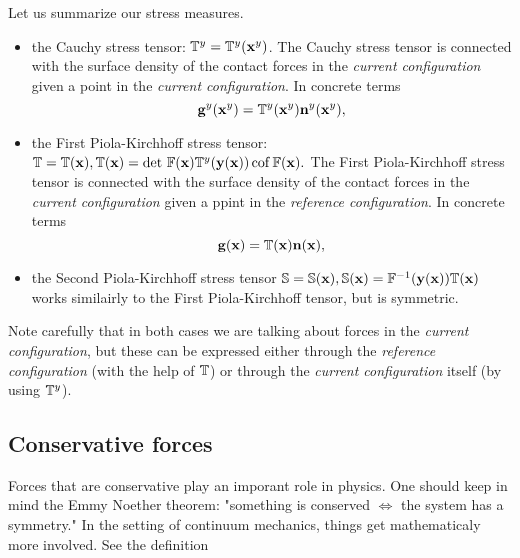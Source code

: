 \documentclass[11pt]{scrartcl} %
\begin{document}
\begin{remark}
    Let us summarize our stress measures.
    \begin{itemize}
	    \item the Cauchy stress tensor: $\mathbb{T}^y = \mathbb{T}^y\qty(\vb{x}^{y})$. The Cauchy stress tensor is connected with the surface density of the contact forces in the \textit{current configuration} given a point in the \textit{current configuration}. In concrete terms
		    \[
			    \vb{g}^{y}\qty(\vb{x}^{y}) = \mathbb{T}^y\qty(\vb{x}^{y})\vb{n}^{y}\qty(\vb{x}^{y}),
		    \]
	    \item the First Piola-Kirchhoff stress tensor: $\mathbb{T} = \mathbb{T}(\vb{x}), \mathbb{T}\qty(\vb{x}) = \det\, \mathbb{F} \qty(\vb{x}) \mathbb{T}^y\qty(\vb{y}\qty(\vb{x})) \operatorname{cof} \mathbb{F} \qty(\vb{x}).$ The First Piola-Kirchhoff stress tensor is connected with the surface density of the contact forces in the \textit{current configuration} given a ppint in the \textit{reference configuration}. In concrete terms
		    \[
			    \vb{g}\qty(\vb{x}) = \mathbb{T}\qty(\vb{x}) \vb{n}\qty(\vb{x}),
		    \]
	    \item the Second Piola-Kirchhoff stress tensor $\mathbb{S} = \mathbb{S}\qty(\vb{x}), \mathbb{S}\qty(\vb{x}) = \mathbb{F}^{-1}\qty(\vb{y}\qty(\vb{x})) \mathbb{T}\qty(\vb{x})$ works similairly to the First Piola-Kirchhoff tensor, but is symmetric.
    \end{itemize}
    Note carefully that in both cases we are talking about forces in the \textit{current configuration}, but these can be expressed either through the \textit{reference configuration} (with the help of $\mathbb{T}$) or through the \textit{current configuration} itself (by using $\mathbb{T}^y$).
\end{remark}

\subsection{Conservative forces}
\label{sec:conservative_forces}

Forces that are conservative play an imporant role in physics. One should keep in mind the Emmy Noether theorem: "something is conserved $\Leftrightarrow$ the system has a symmetry."
In the setting of continuum mechanics, things get mathematicaly more involved. See the definition
\end{document}

